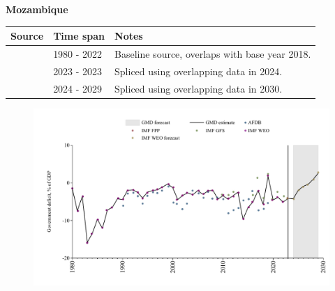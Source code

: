 \documentclass[12pt,a4paper,landscape]{article}
\begin{document}
\begin{adjustbox}{max totalsize={\paperwidth}{\paperheight},center}
\begin{minipage}[t][\textheight][t]{\textwidth}
\vspace*{0.5cm}
{}
\begin{center}
{\Large\bfseries Mozambique}
\end{center}
\vspace{0.5cm}
\begin{table}[H]
\centering
\small
\begin{tabular}{|l|l|l|}
\hline
\textbf{Source} & \textbf{Time span} & \textbf{Notes} \\
\hline
\rowcolor{white}\cite{IMF_WEO}& 1980 - 2022 &Baseline source, overlaps with base year 2018.\\
\rowcolor{lightgray}\cite{IMF_FPP}& 2023 - 2023 &Spliced using overlapping data in 2024.\\
\rowcolor{white}\cite{IMF_WEO_forecast}& 2024 - 2029 &Spliced using overlapping data in 2030.\\
\hline
\end{tabular}
\end{table}
\begin{figure}[H]
\centering
\includegraphics[width=\textwidth,height=0.6\textheight,keepaspectratio]{graphs/MOZ_govdef_GDP.pdf}
\end{figure}
\end{minipage}
\end{adjustbox}
\end{document}
